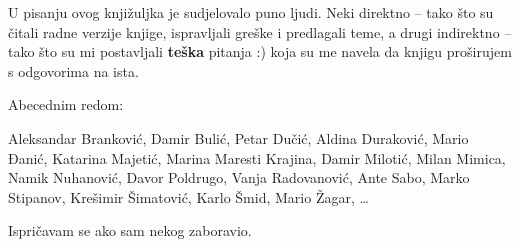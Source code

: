 
U pisanju ovog knjižuljka je sudjelovalo puno ljudi.
Neki direktno -- tako što su čitali radne verzije knjige, ispravljali greške i predlagali teme, a drugi indirektno -- tako što su mi postavljali \textbf{teška} pitanja :) koja su me navela da knjigu proširujem s odgovorima na ista.

Abecednim redom:

Aleksandar Branković,
Damir Bulić,
Petar Dučić,
Aldina Duraković,
Mario Đanić,
Katarina Majetić,
Marina Maresti Krajina,
Damir Milotić, 
Milan Mimica,
Namik Nuhanović,
Davor Poldrugo,
Vanja Radovanović,
Ante Sabo,
Marko Stipanov,
Krešimir Šimatović,
Karlo Šmid,
Mario Žagar,
\dots

Ispričavam se ako sam nekog zaboravio.
